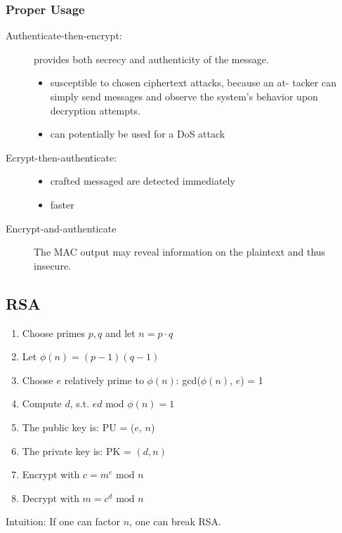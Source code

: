 \subsubsection{Proper Usage}
\begin{description}
  \item[Authenticate-then-encrypt:] provides both secrecy and authenticity of the message.
    \begin{itemize}
      \item susceptible to chosen ciphertext attacks, because an at-
	tacker can simply send messages and observe the system’s behavior upon
	decryption attempts.
      \item can potentially be used for a DoS attack
    \end{itemize}
  \item[Ecrypt-then-authenticate:]
    \begin{itemize}
      \item crafted messaged are detected immediately
      \item faster
    \end{itemize}
  \item[Encrypt-and-authenticate]
    The MAC output may reveal information on the plaintext and thus insecure.
\end{description}
\subsection{RSA}
\begin{enumerate}
  \item Choose primes $p,q$ and let $n = p\cdot q$
  \item Let  $\phi(n) = (p-1)(q-1)$
  \item Choose $e$ relatively prime to  $\phi(n)$: gcd($\phi(n)$, $e$) = 1
  \item Compute $d$, s.t. $ed \text{ mod } \phi(n) = 1$
  \item The public key is: PU = ($e$, $n$)
  \item The private key is: PK =  $(d, n)$
  \item Encrypt with $c = m^e \text{ mod } n $
  \item Decrypt with $m = c^d \text{ mod } n$
\end{enumerate}
Intuition: If one can factor $n$, one can break RSA.

